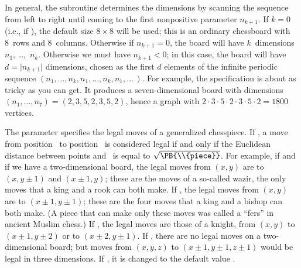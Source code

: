 In general, the  subroutine determines the dimensions by scanning
the
sequence  from left to right
until coming to the first nonpositive parameter $n_{k+1}$. If $k=0$
(i.e., if ), the default size $8\times8$ will be used; this
is
an ordinary chessboard with 8~rows and 8~columns. Otherwise if $n_{k+1}=0$,
the board will have $k$~dimensions $n_1$, \dots,~$n_k$. Otherwise
we must have $n_{k+1}<0$; in this case, the board will have $d=\vert n_{k+1}
\vert$ dimensions, chosen as the first $d$ elements of the infinite
periodic sequence $(n_1,\ldots,n_k,n_1,\ldots,n_k,n_1,\ldots\,)$.
For example, the specification  is about as
tricky as you can get. It produces a seven-dimensional board with
dimensions $(n_1,\ldots,n_7)=(2,3,5,2,3,5,2)$, hence a graph with
$2\cdot3\cdot5\cdot2\cdot3\cdot5\cdot2=1800$ vertices.

The  parameter specifies the legal moves of a generalized
chesspiece.
If , a move from position~ to position~
is considered legal
if and only if the Euclidean distance between points  and~ is
equal to $\sqrt{\vphantom1\smash{\PB{\\{piece}}}}$.
For example, if  and if we have a
two-dimensional board, the legal moves from $(x,y)$ are to $(x,y\pm1)$ and
$(x\pm1,y)$; these are the moves of a so-called wazir, the only moves that
a king and a rook can both make. If , the legal moves
from $(x,y)$
are to $(x\pm1,y\pm1)$; these are the four moves that a king and a bishop
can both make. (A piece that can make only these moves was called a ``fers''
in ancient Muslim chess.) If , the legal moves are those
of a
knight, from $(x,y)$ to $(x\pm1,y\pm2)$ or to $(x\pm2,y\pm1)$. If ,
there are no legal moves on a two-dimensional board; but moves from
$(x,y,z)$ to $(x\pm1,y\pm1,z\pm1)$ would be legal in three dimensions.
If , it is changed to the default value .

